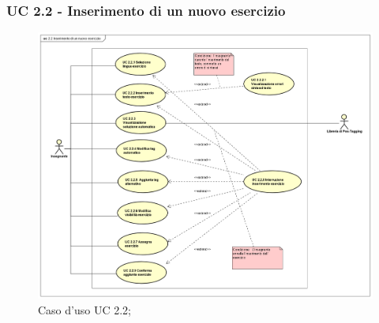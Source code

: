 \subsubsection{UC 2.2 - Inserimento di un nuovo esercizio}
\begin{figure}[H]
	\centering
	\includegraphics[width=17cm]{img/UC22.png} 
	\caption{Caso d'uso UC 2.2;}
\end{figure}

